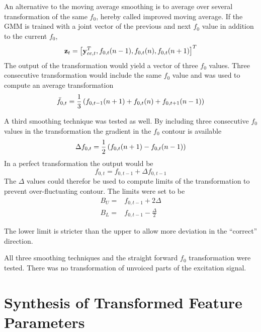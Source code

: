 An alternative to the moving average smoothing is to average over several transformation of the same $f_0$, hereby called improved moving average. If the GMM is trained with a joint vector of the previous and next $f_0$ value in addition to the current $f_0$,
\begin{equation}
	\mathbf{z}_t = \left[\mathbf{y}_{cc,t}^T, f_{0,t}(n-1), f_{0,t}(n), f_{0,t}(n+1)\right]^T 
\end{equation}
The output of the transformation would yield a vector of three $f_0$ values. Three consecutive transformation would include the same $f_0$ value and was used to compute an average transformation
\begin{equation}
	\bar{f}_{0,t} = \frac{1}{3}\left(f_{0,t-1}(n+1)+f_{0,t}(n)+f_{0,t+1}(n-1)\right) 
\end{equation}

A third smoothing technique was tested as well. By including three consecutive $f_0$ values in the transformation the gradient in the $f_0$ contour is available
\begin{equation}
	\Delta f_{0,t} = \frac{1}{2}\left(f_{0,t}(n+1)-f_{0,t}(n-1)\right)
\end{equation}
In a perfect transformation the output would be
\begin{equation}
	f_{0,t} = f_{0,t-1} + \Delta f_{0,t-1}
\end{equation}
The $\Delta$ values could therefor be used to compute limits of the transformation to prevent over-fluctuating contour. The limits were set to be
\begin{equation}
	\begin{split}
		B_U = & f_{0,t-1} + 2\Delta\\
		B_L = & f_{0,t-1} - \frac{\Delta}{2}
	\end{split}
\end{equation} 
\begin{remark}
	The lower limit is stricter than the upper to allow more deviation in the ``correct'' direction.
\end{remark}

All three smoothing techniques and the straight forward $f_0$ transformation were tested. There was no transformation of unvoiced parts of the excitation signal.


\section{Synthesis of Transformed Feature Parameters} %
\label{sec:synthesis_of_transformed_feature_parameters}

